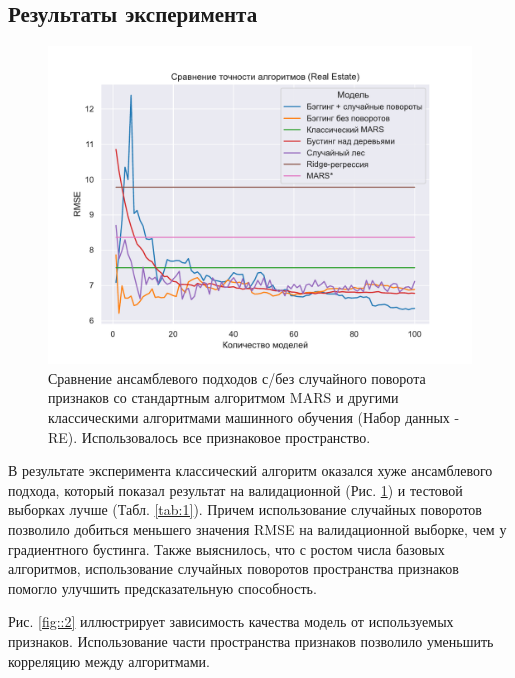 \documentclass{article}
\begin{document}
\subsection{Результаты эксперимента}

\begin{figure}[H] %
\begin{center}
    \includegraphics[scale=0.55]{figures/re_valmodels_2.pdf}
    \caption{Сравнение ансамблевого подходов с/без случайного поворота признаков со стандартным алгоритмом MARS и другими классическими алгоритмами машинного обучения (Набор данных - RE). Использовалось все признаковое пространство.}\label{fig::1}
\end{center}
\end{figure}
В результате эксперимента классический алгоритм оказался хуже ансамблевого подхода, который показал результат на валидационной (Рис. \ref{fig::1}) и тестовой выборках лучше (Табл. \ref{tab:1}).
Причем использование случайных поворотов позволило добиться меньшего значения RMSE на валидационной выборке, чем у градиентного бустинга. Также выяснилось, что с ростом числа базовых алгоритмов, использование случайных поворотов пространства признаков помогло улучшить предсказательную способность.

Рис. \ref{fig::2} иллюстрирует зависимость качества модель от используемых признаков. Использование части пространства признаков позволило уменьшить корреляцию между алгоритмами.
\end{document}
